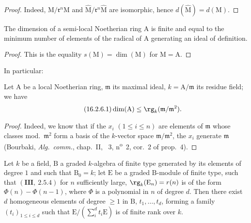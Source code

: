 \begin{proof}
Indeed, $\mathrm{M}/\mathfrak{r}^n\mathrm{M}$ and $\widehat{\mathrm{M}}/\mathfrak{r}^n\widehat{\mathrm{M}}$ are isomorphic, hence $d(\widehat{\mathrm{M}})=d(\mathrm{M})$.
\end{proof}

\begin{corollary}[16.2.5]
\label{0.16.2.5}
The dimension of a semi-local Noetherian ring $\mathrm{A}$ is finite and equal to the minimum number of elements of the radical of $\mathrm{A}$ generating an ideal of definition.
\end{corollary}

\begin{proof}
This is the equality $s(\mathrm{M})=\dim(\mathrm{M})$ for $\mathrm{M}=\mathrm{A}$.
\end{proof}

In particular:

\begin{corollary}[16.2.6]
\label{0.16.2.6}
Let $\mathrm{A}$ be a local Noetherian ring, $\mathfrak{m}$ its maximal ideal, $k=\mathrm{A}/\mathfrak{m}$ its residue field; we have
\begin{equation}
\label{0.16.2.6.1}
\tag{16.2.6.1}
  \dim(\mathrm{A})\leq\rg_k(\mathfrak{m}/\mathfrak{m}^2).
\end{equation}
\end{corollary}

\begin{proof}
Indeed, we know that if the $x_i$ $(1\leq i\leq n)$ are elements of $\mathfrak{m}$ whose classes mod.~$\mathfrak{m}^2$ form a basis of the $k$-vector space $\mathfrak{m}/\mathfrak{m}^2$, the $x_i$ generate $\mathfrak{m}$ (Bourbaki, \emph{Alg.~comm.}, chap.~II, \textsection~3, n\textsuperscript{o}~2, cor.~2 of prop.~4).
\end{proof}


\begin{proposition}[16.2.7]
\label{0.16.2.7}
Let $k$ be a field, $\mathrm{B}$ a graded $k$-algebra of finite type generated by its elements of degree $1$ and such that $\mathrm{B}_0=k$; let $\mathrm{E}$ be a graded $\mathrm{B}$-module of finite type, such that $(\mathbf{III},~2.5.4)$ for $n$ sufficiently large, $\rg_k(\mathrm{E}_n)=r(n)$ is of the form $\Phi(n)-\Phi(n-1)$, where $\Phi$ is a polynomial in $n$ of degree $d$.
Then there exist $d$ homogeneous elements of degree $\geq 1$ in $\mathrm{B}$, $t_1,\ldots,t_d$, forming a family $(t_i)_{1\leq i\leq d}$ such that $\mathrm{E}/(\sum_i^d t_i\mathrm{E})$ is of finite rank over $k$.
\end{proposition}

